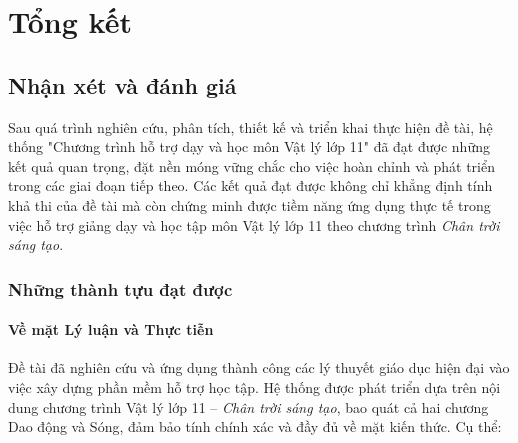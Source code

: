 

\chapter{Tổng kết}

\section{Nhận xét và đánh giá}

Sau quá trình nghiên cứu, phân tích, thiết kế và triển khai thực hiện đề tài, hệ thống "Chương trình hỗ trợ dạy và học môn Vật lý lớp 11" đã đạt được những kết quả quan trọng, đặt nền móng vững chắc cho việc hoàn chỉnh và phát triển trong các giai đoạn tiếp theo. Các kết quả đạt được không chỉ khẳng định tính khả thi của đề tài mà còn chứng minh được tiềm năng ứng dụng thực tế trong việc hỗ trợ giảng dạy và học tập môn Vật lý lớp 11 theo chương trình \textit{Chân trời sáng tạo}.

\subsection{Những thành tựu đạt được}

\subsubsection{Về mặt Lý luận và Thực tiễn}

Đề tài đã nghiên cứu và ứng dụng thành công các lý thuyết giáo dục hiện đại vào việc xây dựng phần mềm hỗ trợ học tập. Hệ thống được phát triển dựa trên nội dung chương trình Vật lý lớp 11 – \textit{Chân trời sáng tạo}, bao quát cả hai chương Dao động và Sóng, đảm bảo tính chính xác và đầy đủ về mặt kiến thức. Cụ thể:

